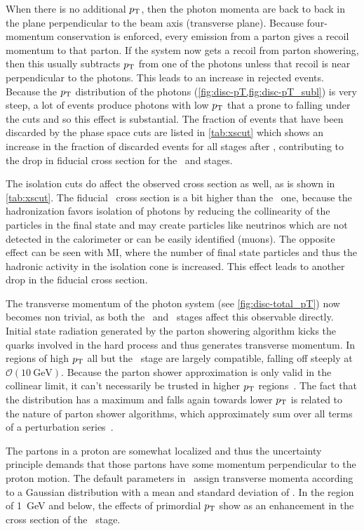 When there is no additional \(p_\mathrm{T}\), then the photon momenta are back
to back in the plane perpendicular to the beam axis (transverse
plane). Because four-momentum conservation is enforced, every emission
from a parton gives a recoil momentum to that parton. If the system
now gets a recoil from parton showering, then this usually subtracts
\(p_\mathrm{T}\) from one of the photons unless that recoil is near
perpendicular to the photons. This leads to an increase in rejected
events. Because the \(p_\mathrm{T}\) distribution of the photons
(\cref{fig:disc-pT,fig:disc-pT_subl}) is very steep, a lot of events
produce photons with low \(p_\mathrm{T}\) that a prone to falling under the
cuts and so this effect is substantial. The fraction of events that
have been discarded by the phase space cuts are listed in
\cref{tab:xscut} which shows an increase in the fraction of discarded
events for all stages after \stone, contributing to the drop in
fiducial cross section for the \sttwo\ and \stthree stages.

The isolation cuts do affect the observed cross section as well, as is
shown in \cref{tab:xscut}. The fiducial \stfour\ cross section is a
bit higher than the \stthree\ one, because the hadronization favors
isolation of photons by reducing the collinearity of the particles in
the final state and may create particles like neutrinos which are not
detected in the calorimeter or can be easily identified (muons). The
opposite effect can be seen with MI, where the number of final state
particles and thus the hadronic activity in the isolation cone is
increased. This effect leads to another drop in the fiducial cross
section.

The transverse momentum of the photon system (see
\cref{fig:disc-total_pT}) now becomes non trivial, as both the \sttwo\
and \stthree\ stages affect this observable directly. Initial state
radiation generated by the parton showering algorithm kicks the quarks
involved in the hard process and thus generates transverse momentum.
In regions of high \(p_\mathrm{T}\) all but the \stone\ stage are largely
compatible, falling off steeply at
\(\mathcal{O}(\SI{10}{\giga\electronvolt})\). Because the parton
shower approximation is only valid in the collinear limit, it can't
necessarily be trusted in higher \(p_\mathrm{T}\)
regions~\cite{buckley:2011ge}. The fact that the distribution has a
maximum and falls again towards lower \(p_\mathrm{T}\) is related to the nature
of parton shower algorithms, which approximately sum over all terms of
a perturbation series~\cite{buckley:2011ge}.

The partons in a proton are somewhat localized and thus the
uncertainty principle demands that those partons have some momentum
perpendicular to the proton motion. The default parameters in \sherpa\
assign transverse momenta according to a Gaussian distribution with a
mean and standard deviation of \gev{.8}.  In the region of
\SI{1}{\giga\electronvolt} and below, the effects of primordial
\(p_\mathrm{T}\) show as an enhancement in the cross section of the \stthree\
stage.

